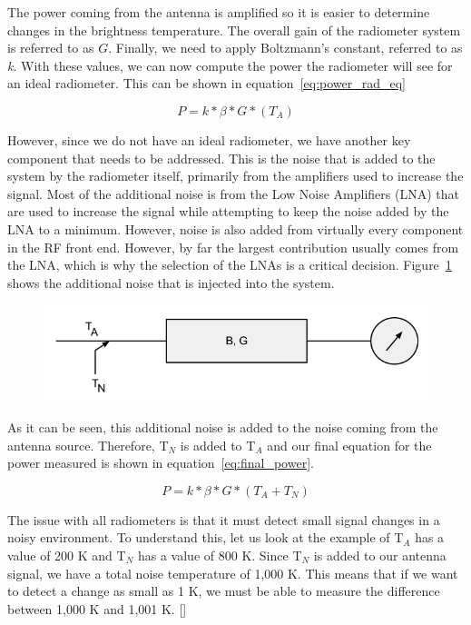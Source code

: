 The power coming from the antenna is amplified so it is easier to determine changes in the brightness temperature.  The overall gain of the radiometer system is referred to as $G$.  Finally, we need to apply Boltzmann's constant, referred to as \textit{k}.  With these values, we can now compute the power the radiometer will see for an ideal radiometer.  This can be shown in equation~\ref{eq:power_rad_eq}

\begin{equation} \label{eq:power_rad_eq}
P=k*\beta*G*(T_{A})
\end{equation}

However, since we do not have an ideal radiometer, we have another key component that needs to be addressed.  This is the noise that is added to the system by the radiometer itself, primarily from the amplifiers used to increase the signal.  Most of the additional noise is from the Low Noise Amplifiers (LNA) that are used to increase the signal while attempting to keep the noise added by the LNA to a minimum.  However, noise is also added from virtually every component in the RF front end.  However, by far the largest contribution usually comes from the LNA, which is why the selection of the LNAs is a critical decision.  Figure~\ref{noiserad} shows the additional noise that is injected into the system.

{\begin{figure}[h!tb] 
\centering
\includegraphics[width=\textwidth]{Images/radiometer_noise_added.png}
\label{noiserad}
\end{figure}
}

As it can be seen, this additional noise is added to the noise coming from the antenna source.  Therefore, T$_{N}$ is added to T$_{A}$ and our final equation for the power measured is shown in equation~\ref{eq:final_power}.  

\begin{equation} \label{eq:final_power}
P=k*\beta*G*(T_{A}+T_{N})
\end{equation}

The issue with all radiometers is that it must detect small signal changes in a noisy environment.  To understand this, let us look at the example of T$_{A}$ has a value of 200 K and T$_{N}$ has a value of 800 K.  Since T$_{N}$ is added to our antenna signal, we have a total noise temperature of 1,000 K.  This means that if we want to detect a change as small as 1 K, we must be able to measure the difference between 1,000 K and 1,001 K. [\cite{skou}]

